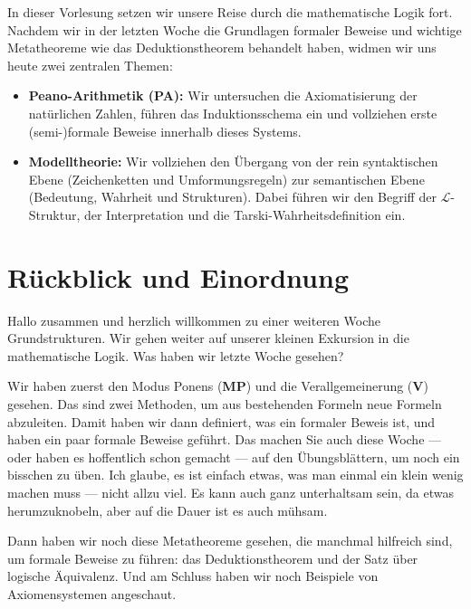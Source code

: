 

\begin{nice-box}
In dieser Vorlesung setzen wir unsere Reise durch die mathematische Logik fort. Nachdem wir in der letzten Woche die Grundlagen formaler Beweise und wichtige Metatheoreme wie das Deduktionstheorem behandelt haben, widmen wir uns heute zwei zentralen Themen:
\begin{itemize}
    \item \textbf{Peano-Arithmetik (PA):} Wir untersuchen die Axiomatisierung der natürlichen Zahlen, führen das Induktionsschema ein und vollziehen erste (semi-)formale Beweise innerhalb dieses Systems.
    \item \textbf{Modelltheorie:} Wir vollziehen den Übergang von der rein syntaktischen Ebene (Zeichenketten und Umformungsregeln) zur semantischen Ebene (Bedeutung, Wahrheit und Strukturen). Dabei führen wir den Begriff der $\mathcal{L}$-Struktur, der Interpretation und die Tarski-Wahrheitsdefinition ein.
\end{itemize}
\end{nice-box}

\section{Rückblick und Einordnung}

\begin{spoken-clean}[00:00:00 - 00:02:15]
Hallo zusammen und herzlich willkommen zu einer weiteren Woche Grundstrukturen. Wir gehen weiter auf unserer kleinen Exkursion in die mathematische Logik. Was haben wir letzte Woche gesehen?

Wir haben zuerst den Modus Ponens (\textbf{MP}) und die Verallgemeinerung (\textbf{V}) gesehen. Das sind zwei Methoden, um aus bestehenden Formeln neue Formeln abzuleiten. Damit haben wir dann definiert, was ein formaler Beweis ist, und haben ein paar formale Beweise geführt. Das machen Sie auch diese Woche --- oder haben es hoffentlich schon gemacht --- auf den Übungsblättern, um noch ein bisschen zu üben. Ich glaube, es ist einfach etwas, was man einmal ein klein wenig machen muss --- nicht allzu viel. Es kann auch ganz unterhaltsam sein, da etwas herumzuknobeln, aber auf die Dauer ist es auch mühsam.

Dann haben wir noch diese Metatheoreme gesehen, die manchmal hilfreich sind, um formale Beweise zu führen: das Deduktionstheorem und der Satz über logische Äquivalenz. Und am Schluss haben wir noch Beispiele von Axiomensystemen angeschaut.
\end{spoken-clean}

